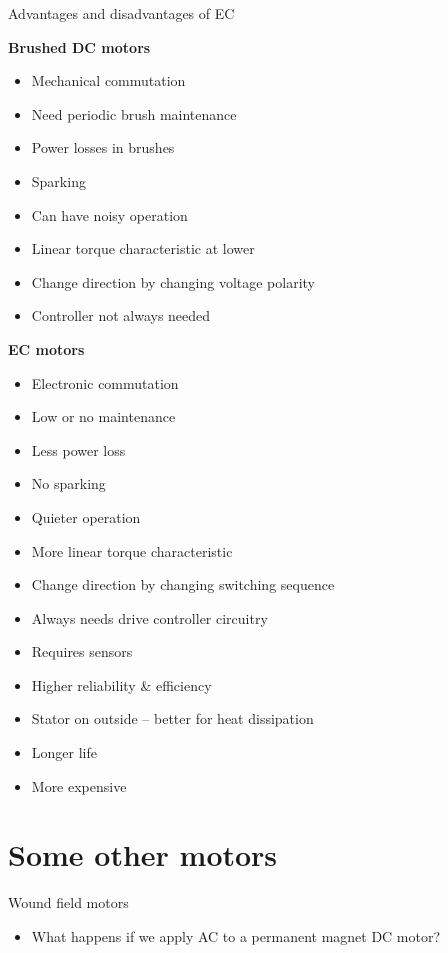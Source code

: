 \documentclass[compress]{beamer}
\begin{document}
\begin{frame}{Advantages and disadvantages of EC}

\textbf{Brushed DC motors}

\begin{itemize}

\item Mechanical commutation
\item Need periodic brush maintenance
\item Power losses in brushes
\item Sparking
\item Can have noisy operation
\item Linear torque characteristic at lower
\item Change direction by changing voltage polarity
\item Controller not always needed
\end{itemize}

\textbf{EC motors}

\begin{itemize}

\item Electronic commutation
\item Low or no maintenance
\item Less power loss
\item No sparking
\item Quieter operation
\item More linear torque characteristic
\item Change direction by changing switching sequence
\item Always needs drive controller circuitry
\item Requires sensors
\item Higher reliability \& efficiency
\item Stator on outside -- better for heat dissipation
\item Longer life
\item More expensive
\end{itemize}

\end{frame}

\section{Some other motors}

\begin{frame}{Wound field motors}

\begin{itemize}

\item What happens if we apply AC to a permanent magnet DC motor?
\end{itemize}

\end{frame}
\end{document}
